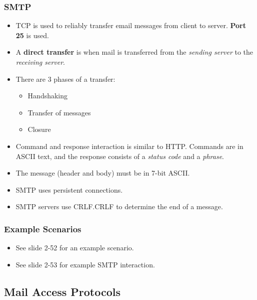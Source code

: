 \documentclass{article}
\begin{document}
\subsubsection{SMTP}

\begin{itemize}
\item TCP is used to reliably transfer email messages from client to server. {\bf Port 25} is used.
\item A {\bf direct transfer} is when mail is transferred from the {\it sending server} to the {\it receiving server}.
\item There are 3 phases of a transfer:
\begin{itemize}
\item Handshaking
\item Transfer of messages
\item Closure
\end{itemize}
\item Command and response interaction is similar to HTTP. Commands are in ASCII text, and the response consists of a {\it status code} and a {\it phrase}.
\item The message (header and body) must be in 7-bit ASCII.
\item SMTP uses persistent connections.
\item SMTP servers use CRLF.CRLF to determine the end of a message.
\end{itemize}

\subsubsection{Example Scenarios}

\begin{itemize}
\item See slide 2-52 for an example scenario.
\item See slide 2-53 for example SMTP interaction.
\end{itemize}

\subsection{Mail Access Protocols}
\end{document}
